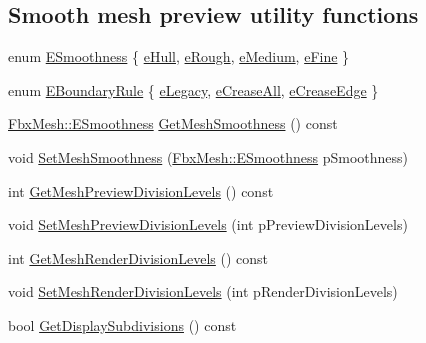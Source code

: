 \subsection*{Smooth mesh preview utility functions}
\begin{DoxyCompactItemize}
\item 
enum \hyperlink{class_fbx_mesh_a7ac812140810290f718863c170279cf3}{E\+Smoothness} \{ \hyperlink{class_fbx_mesh_a7ac812140810290f718863c170279cf3a61535903625ba3bc7ccdc3cc5ee033d2}{e\+Hull}, 
\hyperlink{class_fbx_mesh_a7ac812140810290f718863c170279cf3a9ff959ffb9b9b71b38bfe00b075761e5}{e\+Rough}, 
\hyperlink{class_fbx_mesh_a7ac812140810290f718863c170279cf3a7c2545de5f52e18d4e4710afe3e281f7}{e\+Medium}, 
\hyperlink{class_fbx_mesh_a7ac812140810290f718863c170279cf3aec8790ff635fec3367a3b8eedbd9b77b}{e\+Fine}
 \}
\item 
enum \hyperlink{class_fbx_mesh_ab9e7d41ffcd49467a374c72e0d6f3561}{E\+Boundary\+Rule} \{ \hyperlink{class_fbx_mesh_ab9e7d41ffcd49467a374c72e0d6f3561a0501acd66025ba08d7add2fa09805731}{e\+Legacy}, 
\hyperlink{class_fbx_mesh_ab9e7d41ffcd49467a374c72e0d6f3561a796c15aa83f0cd6bf190d963c0c7d728}{e\+Crease\+All}, 
\hyperlink{class_fbx_mesh_ab9e7d41ffcd49467a374c72e0d6f3561a05e4c2c5eee265c654273b2902f246e1}{e\+Crease\+Edge}
 \}
\item 
\hyperlink{class_fbx_mesh_a7ac812140810290f718863c170279cf3}{Fbx\+Mesh\+::\+E\+Smoothness} \hyperlink{class_fbx_mesh_a6833d3eb2e1fe34a5073149a2eb5544a}{Get\+Mesh\+Smoothness} () const
\item 
void \hyperlink{class_fbx_mesh_ab07446f1c0dd0bae4597bb20a9d27265}{Set\+Mesh\+Smoothness} (\hyperlink{class_fbx_mesh_a7ac812140810290f718863c170279cf3}{Fbx\+Mesh\+::\+E\+Smoothness} p\+Smoothness)
\item 
int \hyperlink{class_fbx_mesh_a59da6ff39a8d5247e1b6d996aecf8dab}{Get\+Mesh\+Preview\+Division\+Levels} () const
\item 
void \hyperlink{class_fbx_mesh_ab995458b16288d77cd44487a9f63369a}{Set\+Mesh\+Preview\+Division\+Levels} (int p\+Preview\+Division\+Levels)
\item 
int \hyperlink{class_fbx_mesh_adbcf24d50b58f317654fc771f11fe35c}{Get\+Mesh\+Render\+Division\+Levels} () const
\item 
void \hyperlink{class_fbx_mesh_a3926ddbfb4988f931ffdceef555243a6}{Set\+Mesh\+Render\+Division\+Levels} (int p\+Render\+Division\+Levels)
\item 
bool \hyperlink{class_fbx_mesh_ad1eee689b760a6147a2ee8090453ea9b}{Get\+Display\+Subdivisions} () const

\end{DoxyCompactItemize}

